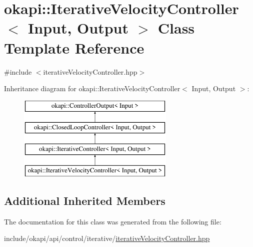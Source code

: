 \hypertarget{classokapi_1_1IterativeVelocityController}{}\section{okapi\+::Iterative\+Velocity\+Controller$<$ Input, Output $>$ Class Template Reference}
\label{classokapi_1_1IterativeVelocityController}


{\ttfamily \#include $<$iterative\+Velocity\+Controller.\+hpp$>$}

Inheritance diagram for okapi\+::Iterative\+Velocity\+Controller$<$ Input, Output $>$\+:\begin{figure}[H]
\begin{center}
\leavevmode
\includegraphics[height=4.000000cm]{classokapi_1_1IterativeVelocityController}
\end{center}
\end{figure}
\subsection*{Additional Inherited Members}


The documentation for this class was generated from the following file\+:\begin{DoxyCompactItemize}
\item 
include/okapi/api/control/iterative/\mbox{\hyperlink{iterativeVelocityController_8hpp}{iterative\+Velocity\+Controller.\+hpp}}\end{DoxyCompactItemize}
